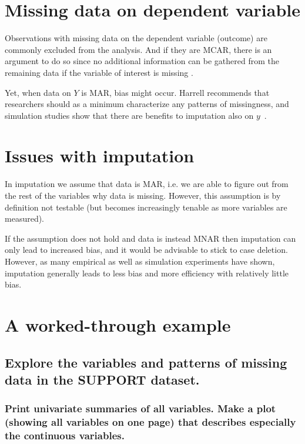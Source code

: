 \documentclass[headinclude=true, headsepline=true, DIV14]{scrartcl}\usepackage[]{graphicx}\usepackage[]{color}
\begin{document}
\section{Missing data on dependent variable}

Observations with missing data on the dependent variable (outcome) are commonly
excluded from the analysis. And if they are MCAR, there is an argument to do so
since no additional information can be gathered from the remaining data if
the variable of interest is missing \cite{Harrell_2015}.

Yet, when data on $Y$ is MAR, bias might occur. Harrell recommends that
researchers should as a minimum characterize any patterns of missingness, and
simulation studies show that there are benefits to imputation also on $y$~\cite{hippel_4_2007}.

\section{Issues with imputation}

In imputation we assume that data is MAR, i.e. we are able to figure out from
the rest of the variables why data is missing. However, this assumption is by
definition not testable \cite{grahamjohnw._missing_2012}
(but becomes increasingly tenable as more variables are measured).

If the assumption does not hold and data is instead MNAR then
imputation can only lead to increased bias, and it would be advisable to stick
to case deletion. However, as many empirical as well
as simulation experiments have shown, imputation generally leads to less bias
and more efficiency with relatively little bias.

\section{A worked-through example}




\subsection{Explore the variables and patterns of missing data in the SUPPORT
dataset.}
\subsubsection{Print univariate summaries of all variables. Make a plot (showing all
variables on one page) that describes especially the continuous variables.}
\end{document}
